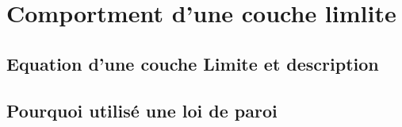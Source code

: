 \section{Comportment d'une couche limlite}
\subsection{Equation d'une couche Limite et description}
\subsection{Pourquoi utilisé une loi de paroi}

